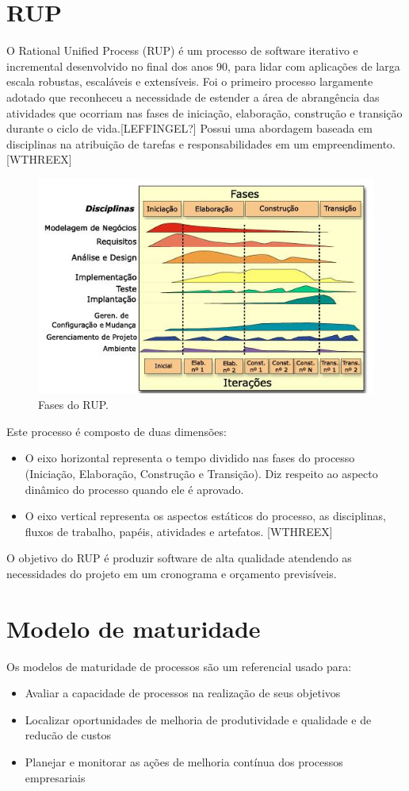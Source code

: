   \section{RUP}
  O Rational Unified Process (RUP) é um processo de software iterativo e incremental desenvolvido no final dos anos 90, para lidar com aplicações de larga escala robustas, escaláveis e extensíveis. Foi o primeiro processo largamente adotado que reconheceu a necessidade de estender a área de abrangência das atividades que ocorriam nas fases de iniciação, elaboração, construção e transição durante o ciclo de vida.[LEFFINGEL?] Possui uma abordagem baseada em disciplinas na atribuição de tarefas e responsabilidades em um empreendimento. [WTHREEX]
    \begin{figure}[!htbp]
    \centering
    \includegraphics[scale=3.0]{editaveis/figuras/Fases_do_RUP_-_portugues}
    \caption[Fases do RUP]{Fases do RUP. \footnotemark}
    \label{fases-rup}
  \end{figure}
Este processo é composto de duas dimensões:
\begin{itemize}
\item O eixo horizontal representa o tempo dividido nas fases do processo 	(Iniciação, Elaboração, Construção e Transição). Diz 	respeito ao aspecto dinâmico do processo quando ele é aprovado.
\item O eixo vertical representa os aspectos estáticos do processo, as 	disciplinas, fluxos de trabalho, papéis, atividades e artefatos. 	[WTHREEX]
\end{itemize}

O objetivo do RUP é produzir software de alta qualidade atendendo as necessidades do projeto em um cronograma e orçamento previsíveis.
  \section{Modelo de maturidade}
  Os modelos de maturidade de processos são um referencial usado para:
\begin{itemize}
\item Avaliar a capacidade de processos na realização de seus objetivos
\item Localizar oportunidades de melhoria de produtividade e qualidade e de reducão de custos
\item Planejar e monitorar as ações de melhoria contínua dos processos empresariais
\end{itemize}


